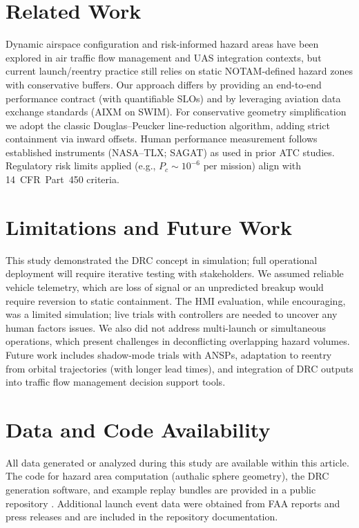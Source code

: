 \documentclass[journal]{new-aiaa}
\newcommand{\DRC}{\textsc{DRC}}
\newcommand{\AIXM}{\textsc{AIXM}}
\newcommand{\SWIM}{\textsc{SWIM}}
\begin{document}
\section{Related Work}
Dynamic airspace configuration and risk-informed hazard areas have been explored in air traffic flow management and UAS integration contexts, but current launch/reentry practice still relies on static NOTAM-defined hazard zones with conservative buffers.\cite{CRS2019} Our approach differs by providing an end-to-end performance contract (with quantifiable SLOs) and by leveraging aviation data exchange standards (\AIXM{} on \SWIM{}). For conservative geometry simplification we adopt the classic Douglas–Peucker line-reduction algorithm,\cite{DouglasPeucker} adding strict containment via inward offsets. Human performance measurement follows established instruments (NASA--TLX; SAGAT) as used in prior ATC studies.\cite{NASA_TLX,Endsley_SAGAT} Regulatory risk limits applied (e.g., $P_c\sim10^{-6}$ per mission) align with 14~CFR~Part~450 criteria.\cite{CFR450}

\section{Limitations and Future Work}
This study demonstrated the \DRC{} concept in simulation; full operational deployment will require iterative testing with stakeholders. We assumed reliable vehicle telemetry, which are loss of signal or an unpredicted breakup would require reversion to static containment. The HMI evaluation, while encouraging, was a limited simulation; live trials with controllers are needed to uncover any human factors issues. We also did not address multi-launch or simultaneous operations, which present challenges in deconflicting overlapping hazard volumes. Future work includes shadow-mode trials with ANSPs, adaptation to reentry from orbital trajectories (with longer lead times), and integration of \DRC{} outputs into traffic flow management decision support tools.

\section*{Data and Code Availability}
All data generated or analyzed during this study are available within this article. The code for hazard area computation (authalic sphere geometry), the \DRC{} generation software, and example replay bundles are provided in a public repository \textbf{}. Additional launch event data were obtained from FAA reports and press releases\cite{FAA_SDI_2021,FAA_SDI_2024} and are included in the repository documentation.
\end{document}
